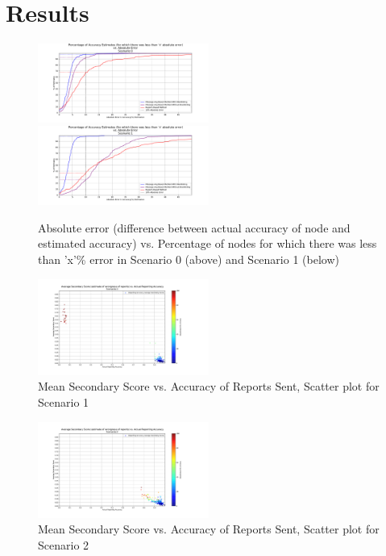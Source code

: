 \documentclass[journal]{IEEEtran}
\begin{document}
\section{Results}
\label{sec:Results}
\begin{figure}[!t]
	\includegraphics[width=0.5\textwidth, trim={80 20 80 30},clip]{images/SCN0_AbsoluteErrorsInEstimationComparison.pdf}
	\includegraphics[width=0.5\textwidth, trim={80 20 80 30},clip]{images/SCN1_AbsoluteErrorsInEstimationComparison.pdf}
	\caption{Absolute error (difference between actual accuracy of node and estimated accuracy) vs. Percentage of nodes for which there was less than 'x'\% error in Scenario 0 (above) and Scenario 1 (below)}
	\label{fig:plot:comparitiveSCN0&1}
\end{figure}
\begin{figure}[!t]
	\includegraphics[width=0.5\textwidth, trim={100 50 185 72},clip]{images/SCN1_ReportingAccuracy_Vs_AvgSecondaryScore.pdf}
	\caption{Mean Secondary Score vs. Accuracy of Reports Sent, Scatter plot for Scenario 1}
	\label{fig:plot:ssSCN1}
\end{figure}
\begin{figure}[!t]	
	\includegraphics[width=0.5\textwidth, trim={100 50 185 72},clip]{images/SCN2_ReportingAccuracy_Vs_AvgSecondaryScore.pdf}
	\caption{Mean Secondary Score vs. Accuracy of Reports Sent, Scatter plot for Scenario 2}
	\label{fig:plot:ssSCN2}
\end{figure}
\end{document}
